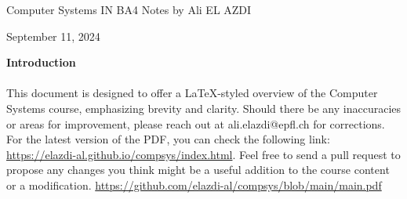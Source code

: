 \documentclass[../../compsys.tex]{subfiles}
\begin{document}
\begin{titlepage}
    \centering
    \vspace*{1cm}
    \Huge
    Computer Systems \newline
    \vspace{10px}
    \LARGE IN BA4
    \vspace*{10px}
    \newline
    \Large Notes by Ali EL AZDI

    \vfill
    \large
    September 11, 2024
\end{titlepage}

\begin{center}
    \vspace*{1cm}
    \textbf{Introduction}
    \newline
    \paragraph[short]{}{This document is designed to offer a LaTeX-styled overview of the Computer Systems course, emphasizing brevity and clarity. Should there be any inaccuracies or areas for improvement, please reach out at ali.elazdi@epfl.ch for corrections. For the latest version of the PDF, you can check the following link: 
    \url{https://elazdi-al.github.io/compsys/index.html}. Feel free to send a pull request to propose any changes you think might be a useful addition to the course content or a modification.}
    \newline
   \url{
        https://github.com/elazdi-al/compsys/blob/main/main.pdf
    }
    \newline
\end{center}


\tableofcontents
\end{document}
